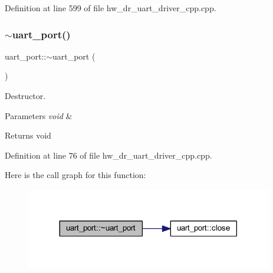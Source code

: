 Definition at line 599 of file hw\+\_\+dr\+\_\+uart\+\_\+driver\+\_\+cpp.\+cpp.

\mbox{\label{group___u_a_r_t_ga9f076c4fef2cc15f1bd61df2e139ce97}} 
\subsubsection{$\sim$uart\_port()}
{\footnotesize\ttfamily uart\+\_\+port\+::$\sim$uart\+\_\+port (\begin{DoxyParamCaption}\item[{void}]{ }\end{DoxyParamCaption})}



Destructor. 


\begin{DoxyParams}{Parameters}
{\em void} & \\
\hline
\end{DoxyParams}
\begin{DoxyReturn}{Returns}
void 
\end{DoxyReturn}


Definition at line 76 of file hw\+\_\+dr\+\_\+uart\+\_\+driver\+\_\+cpp.\+cpp.

Here is the call graph for this function\+:
\nopagebreak
\begin{figure}[H]
\begin{center}
\leavevmode
\includegraphics[width=305pt]{group___u_a_r_t_ga9f076c4fef2cc15f1bd61df2e139ce97_cgraph}
\end{center}
\end{figure}
